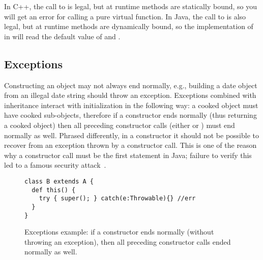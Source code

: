 In C++, the call to  is legal,
    but at runtime
    methods are statically bound,
    so you will get an error for calling a pure virtual function.
In Java, the call to  is also legal,
    but at runtime
    methods are dynamically bound,
    so the implementation of  in 
    will read the default value of  and .




\subsection{Exceptions}
Constructing an object may not always end normally,
    e.g., building a date object from an illegal date string should throw an exception.
Exceptions combined with inheritance interact with initialization in the following way:
    a cooked object must have cooked sub-objects,
    therefore if a constructor ends normally (thus returning a cooked object)
    then all preceding constructor calls (either  or )
    must end normally as well.
Phrased differently, in a constructor it should not be possible to
    recover from an exception thrown by a constructor call.
This is one of the reason why a constructor call must be the first statement in Java;
    failure to verify this led to a famous security attack~\cite{Dean:1996}.

\begin{figure}
\begin{lstlisting}
class B extends A {
  def this() {
    try { super(); } catch(e:Throwable){} //err
  }
}
\end{lstlisting}
\caption{Exceptions example:
    if a constructor ends normally (without throwing an exception),
        then all preceding constructor calls ended normally as well.
    }
\label{Figure:Exceptions}
\end{figure}



